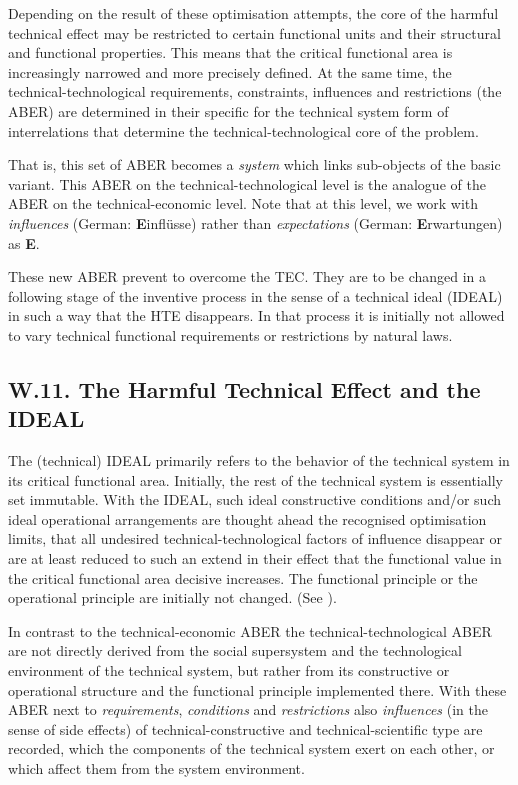 \documentclass[11pt,a4paper]{article}
\begin{document}
Depending on the result of these optimisation attempts, the core of the
harmful technical effect may be restricted to certain functional units and
their structural and functional properties. This means that the critical
functional area is increasingly narrowed and more precisely defined.  At the
same time, the technical-technological requirements, constraints, influences
and restrictions (the ABER) are determined in their specific for the technical
system form of interrelations that determine the technical-technological core
of the problem.

That is, this set of ABER becomes a \emph{system} which links sub-objects of
the basic variant. This ABER on the technical-technological level is the
analogue of the ABER on the technical-economic level. Note that at this level,
we work with \emph{influences} (German: \textbf{E}inflüsse) rather than
\emph{expectations} (German: \textbf{E}rwartungen) as \textbf{E}.

These new ABER prevent to overcome the TEC. They are to be changed in a
following stage of the inventive process in the sense of a technical ideal
(IDEAL) in such a way that the HTE disappears. In that process it is initially
not allowed to vary technical functional requirements or restrictions by
natural laws.

\subsection*{W.11. The Harmful Technical Effect and the IDEAL}

The (technical) IDEAL primarily refers to the behavior of the technical system
in its critical functional area. Initially, the rest of the technical system
is essentially set immutable. With the IDEAL, such ideal constructive
conditions and/or such ideal operational arrangements are thought ahead the
recognised optimisation limits, that all undesired technical-technological
factors of influence disappear or are at least reduced to such an extend in
their effect that the functional value in the critical functional area
decisive increases. The functional principle or the operational principle are
initially not changed.  (See \cite[A.6]{RM-21}).

In contrast to the technical-economic ABER the technical-technological ABER
are not directly derived from the social supersystem and the technological
environment of the technical system, but rather from its constructive or
operational structure and the functional principle implemented there.  With
these ABER next to \emph{requirements}, \emph{conditions} and
\emph{restrictions} also \emph{influences} (in the sense of side effects) of
technical-constructive and technical-scientific type are recorded, which the
components of the technical system exert on each other, or which affect them
from the system environment.
\end{document}
